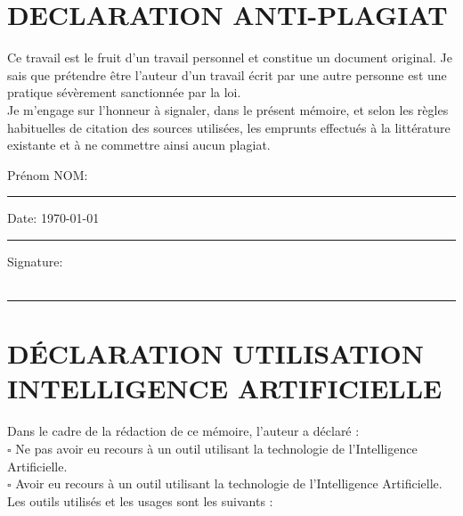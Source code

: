 \section*{\Large DECLARATION ANTI-PLAGIAT}
Ce travail est le fruit d'un travail personnel et constitue un document original. Je sais que prétendre être l'auteur d'un travail écrit par une autre personne est une pratique sévèrement sanctionnée par la loi.\\
Je m'engage sur l'honneur à signaler, dans le présent mémoire, et selon les règles habituelles de citation des sources utilisées, les emprunts effectués à la littérature existante et à ne commettre ainsi aucun plagiat.\\
\vspace*{1cm}

\noindent Prénom NOM: \\[1mm]
\rule[1em]{25em}{0.5pt}

\noindent Date: \today \\[1mm]
\rule[1em]{25em}{0.5pt}

\noindent Signature:\\[1mm]
\\
\rule[1em]{25em}{0.5pt}


\newpage
\section*{DÉCLARATION UTILISATION INTELLIGENCE ARTIFICIELLE}
Dans le cadre de la rédaction de ce mémoire, l'auteur a déclaré :\\[1em]

\noindent $\square$ Ne pas avoir eu recours à un outil utilisant la technologie de l'Intelligence Artificielle.\\[1em]

\noindent $\square$ Avoir eu recours à un outil utilisant la technologie de l'Intelligence Artificielle.\\[1em]

\noindent Les outils utilisés et les usages sont les suivants : \\[0.5em]
\newpage
